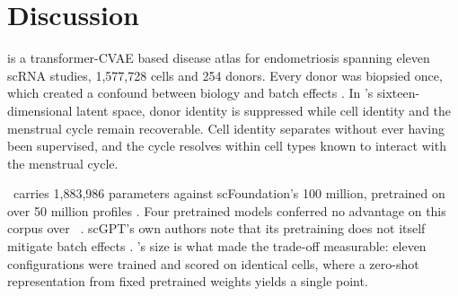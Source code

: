 %
%

\section*{Discussion}

\elaj is a transformer-CVAE based disease atlas for endometriosis spanning 
eleven scRNA studies, 1{,}577{,}728 cells and 254 donors. Every donor was 
biopsied once, which created a confound between biology and batch effects 
\citep{hrovatin2025atlases}. In \elaj's sixteen-dimensional latent space,
donor identity is suppressed while cell identity and the menstrual cycle
remain recoverable. Cell identity separates without ever having been
supervised, and the cycle resolves within cell types known to interact 
with the menstrual cycle.

\elaj\ carries 1{,}883{,}986 parameters against scFoundation's 100 million, 
pretrained on over 50 million profiles \citep{hao2024scfoundation}. Four 
pretrained models conferred no advantage on this corpus over \elaj\
\citep{cui2024scgpt,theodoris2023geneformer,heimberg2025scimilarity,kedzierska2025zeroshot}.
scGPT's own authors note that its pretraining does not itself mitigate 
batch effects \citep{cui2024scgpt}. \elaj's size is what made the trade-off
measurable: eleven configurations were trained and scored on identical cells,
where a zero-shot representation from fixed pretrained weights yields a 
single point.


